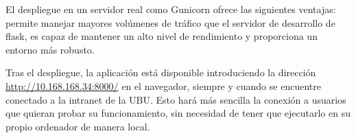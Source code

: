El despliegue en un servidor real como Gunicorn ofrece las siguientes ventajas: permite manejar mayores volúmenes de tráfico que el servidor de desarrollo de flask, es capaz de mantener un alto nivel de rendimiento y proporciona un entorno más robusto.

Tras el despliegue, la aplicación está disponible introduciendo la dirección \url{http://10.168.168.34:8000/} en el navegador, siempre y cuando se encuentre conectado a la intranet de la UBU. Esto hará más sencilla la conexión a usuarios que quieran probar su funcionamiento, sin necesidad de tener que ejecutarlo en su propio ordenador de manera local.